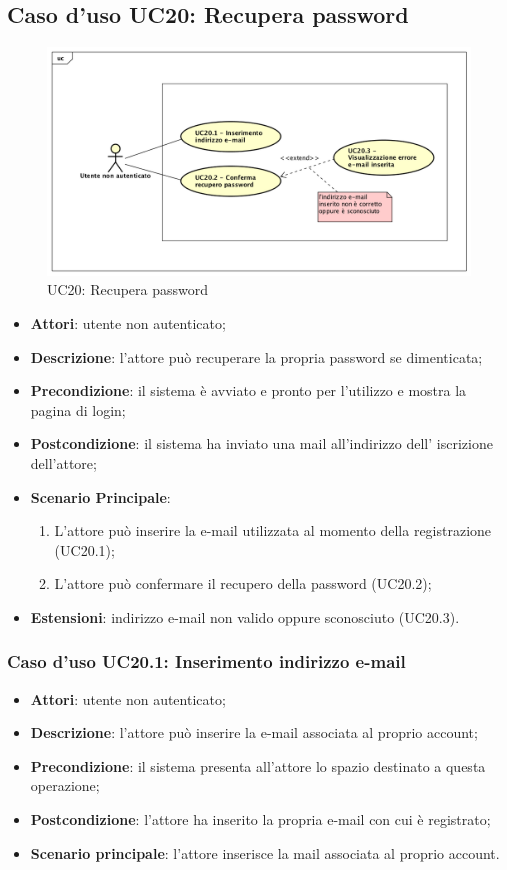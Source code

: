 \newpage
\subsection{Caso d'uso UC20: Recupera password}
\label{UC20}
\begin{figure}[ht]
	\centering
	\includegraphics[scale=0.48]{UML/UC20.png}
	\caption{UC20: Recupera password}
\end{figure}
\FloatBarrier
\begin{itemize}
	\item \textbf{Attori}: utente non autenticato;
	\item \textbf{Descrizione}: l'attore può recuperare la propria password se dimenticata;
	\item \textbf{Precondizione}: il sistema è avviato e pronto per l'utilizzo e mostra la pagina di login;
	\item \textbf{Postcondizione}: il sistema ha inviato una mail all'indirizzo dell' iscrizione dell'attore;
	\item \textbf{Scenario Principale}:
	\begin{enumerate}
		\item L'attore può inserire la e-mail utilizzata al momento della registrazione (UC20.1);
		\item L'attore può confermare il recupero della password (UC20.2);
	\end{enumerate}
	\item \textbf{Estensioni}: indirizzo e-mail non valido oppure sconosciuto (UC20.3).
\end{itemize}

\subsubsection{Caso d'uso UC20.1: Inserimento indirizzo e-mail}
\begin{itemize}
	\item \textbf{Attori}: utente non autenticato;
	\item \textbf{Descrizione}: l'attore può inserire la e-mail associata al proprio account;
	\item \textbf{Precondizione}: il sistema presenta all'attore lo spazio destinato a questa operazione;
	\item \textbf{Postcondizione}: l'attore ha inserito la propria e-mail con cui è registrato;
	\item \textbf{Scenario principale}: l'attore inserisce la mail associata al proprio account. 
\end{itemize}

